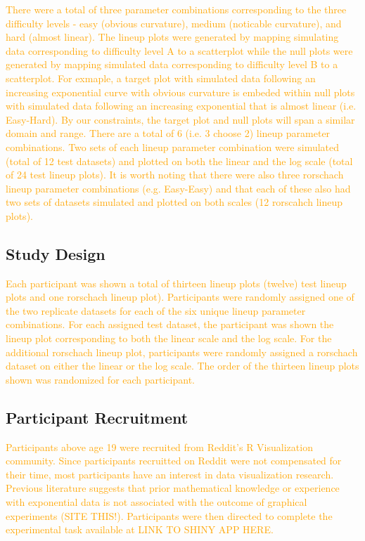 \documentclass[]{interact}
\theoremstyle{plain}%
\theoremstyle{definition}
\theoremstyle{remark}
\begin{document}
\textcolor{Orange}{There were a total of three parameter combinations corresponding to the three difficulty levels - easy (obvious curvature), medium (noticable curvature), and hard (almost linear). 
The lineup plots were generated by mapping simulating data corresponding to difficulty level A to a scatterplot while the null plots were generated by mapping simulated data corresponding to difficulty level B to a scatterplot. 
For exmaple, a target plot with simulated data following an increasing exponential curve with obvious curvature is embeded within null plots with simulated data following an increasing exponential that is almost linear (i.e. Easy-Hard). 
By our constraints, the target plot and null plots will span a similar domain and range. 
There are a total of 6 (i.e. 3 choose 2) lineup parameter combinations.
Two sets of each lineup parameter combination were simulated (total of 12 test datasets) and plotted on both the linear and the log scale (total of 24 test lineup plots). 
It is worth noting that there were also three rorschach lineup parameter combinations (e.g. Easy-Easy) and that each of these also had two sets of datasets simulated and plotted on both scales (12 rorscahch lineup plots).
}

\hypertarget{study-design}{%
\subsection{Study Design}\label{study-design}}

\textcolor{Orange}{
Each participant was shown a total of thirteen lineup plots (twelve) test lineup plots and one rorschach lineup plot). Participants were randomly assigned one of the two replicate datasets for each of the six unique lineup parameter combinations. For each assigned test dataset, the participant was shown the lineup plot corresponding to both the linear scale and the log scale. For the additional rorschach lineup plot, participants were randomly assigned a rorschach dataset on either the linear or the log scale. The order of the thirteen lineup plots shown was randomized for each participant. 
}

\hypertarget{participant-recruitment}{%
\subsection{Participant Recruitment}\label{participant-recruitment}}

\textcolor{Orange}{Participants above age 19 were recruited from Reddit's R Visualization community. 
Since participants recruitted on Reddit were not compensated for their time, most participants have an interest in data visualization research. 
Previous literature suggests that prior mathematical knowledge or experience with exponential data is not associated with the outcome of graphical experiments (SITE THIS!). 
Participants were then directed to complete the experimental task available at LINK TO SHINY APP HERE.
}
\end{document}
